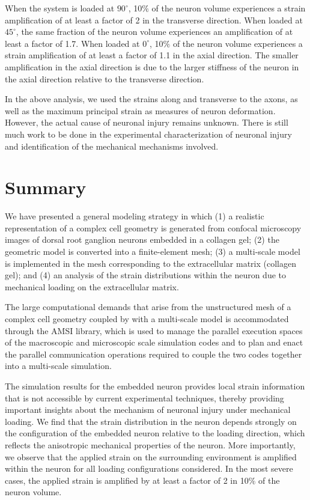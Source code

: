 \documentclass[]{interact}
\begin{document}
When the system is loaded at $90^{\circ}$, 10$\%$ of the neuron volume experiences a strain amplification of at least a factor of 2 in the transverse direction. When loaded at $45^{\circ}$, the same fraction of the neuron volume experiences an amplification of at least a factor of 1.7. When loaded at $0^{\circ}$, 10$\%$ of the neuron volume experiences a strain amplification of at least a factor of 1.1 in the axial direction. The smaller amplification in the axial direction is due to the larger stiffness of the neuron in the axial direction relative to the transverse direction. 

In the above analysis, we used the strains along and transverse to the axons, as well as the maximum principal strain as measures of neuron deformation. However, the actual cause of neuronal injury remains unknown. There is still much work to be done in the experimental characterization of neuronal injury and identification of the mechanical mechanisms involved.
\section{Summary}
\label{sec:summary}

We have presented a general modeling strategy in which (1) a realistic representation of a complex cell geometry is generated from confocal microscopy images of dorsal root ganglion neurons embedded in a collagen gel; (2) the geometric model is converted into a finite-element mesh; (3) a multi-scale model is implemented in the mesh corresponding to the extracellular matrix (collagen gel); and (4) an analysis of the strain distributions within the neuron due to mechanical loading on the extracellular matrix.

The large computational demands that arise from the unstructured mesh of a complex cell geometry coupled by with a multi-scale model is accommodated through the AMSI library, which is used to manage the parallel execution spaces of the macroscopic and microscopic scale simulation codes and to plan and enact the parallel communication operations required to couple the two codes together into a multi-scale simulation. 

The simulation results for the embedded neuron provides local strain information that is not accessible by current experimental techniques, thereby providing important insights about the mechanism of neuronal injury under mechanical loading. We find that the strain distribution in the neuron depends strongly on the configuration of the embedded neuron relative to the loading direction, which reflects the anisotropic mechanical properties of the neuron. More importantly, we observe that the applied strain on the surrounding environment is amplified within the neuron for all loading configurations considered. In the most severe cases, the applied strain is amplified by at least a factor of 2 in 10$\%$ of the neuron volume. 
\end{document}
